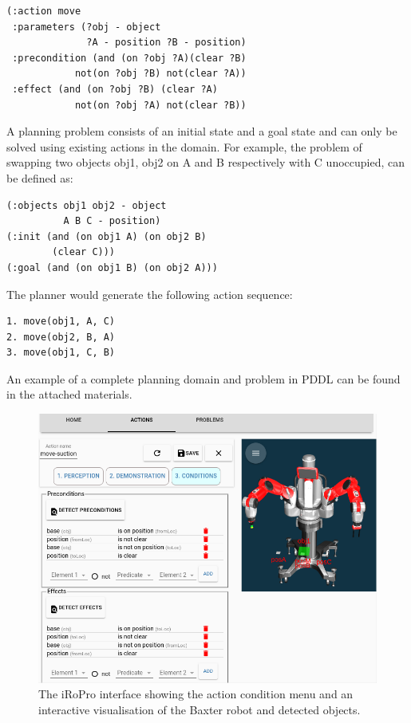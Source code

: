\begin{verbatim}
(:action move
 :parameters (?obj - object 
              ?A - position ?B - position)
 :precondition (and (on ?obj ?A)(clear ?B)
            not(on ?obj ?B) not(clear ?A))
 :effect (and (on ?obj ?B) (clear ?A)
            not(on ?obj ?A) not(clear ?B))
\end{verbatim}

A planning problem consists of an initial state and a goal state and can only be solved using existing actions in the domain.
For example, the problem of swapping two objects obj1, obj2 on A and B respectively with C unoccupied, can be defined as:
\begin{verbatim}
(:objects obj1 obj2 - object
          A B C - position)
(:init (and (on obj1 A) (on obj2 B) 
        (clear C)))
(:goal (and (on obj1 B) (on obj2 A)))
\end{verbatim}
The planner would generate the following action sequence:
\begin{verbatim}
1. move(obj1, A, C)
2. move(obj2, B, A)
3. move(obj1, C, B)
\end{verbatim}
An example of a complete planning domain and problem in PDDL can be found in the attached materials.

\begin{figure}[t]
\includegraphics[width=\linewidth]{figures/gui.png}
    \caption{The iRoPro interface showing the action condition menu and an interactive visualisation of the Baxter robot and detected objects.}\label{fig:gui-action-3}%
\end{figure}

